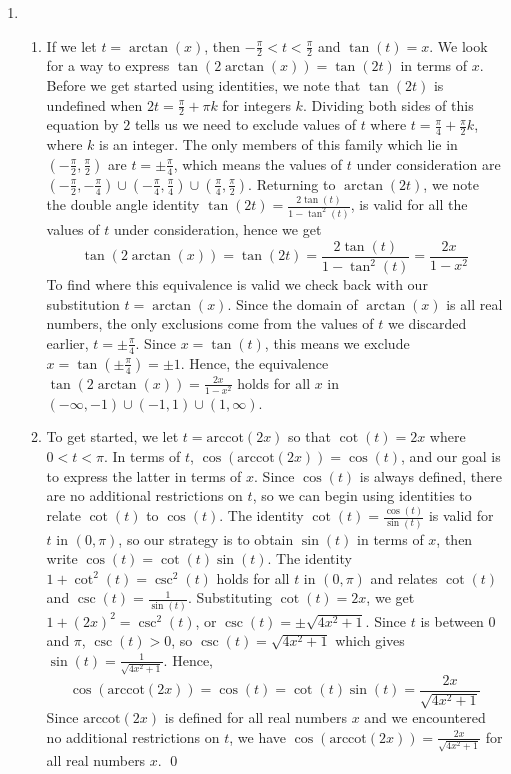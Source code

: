 \documentclass[12pt]{ximera}
\begin{document}
\begin{example}
\begin{enumerate}
\item  

\begin{enumerate}

\item If we let $t = \arctan(x)$, then $-\frac{\pi}{2} < t < \frac{\pi}{2}$ and $\tan(t) = x$.   We look for a way to express $\tan(2 \arctan(x)) = \tan(2t)$ in terms of $x$.  Before we get started using identities, we note that $\tan(2t)$ is undefined when $2t = \frac{\pi}{2} + \pi k$ for integers $k$.  Dividing both sides of this equation by $2$ tells us we need to exclude values of $t$ where $t = \frac{\pi}{4} + \frac{\pi}{2} k$, where $k$ is an integer.  The only members of this family which lie in $\left(-\frac{\pi}{2}, \frac{\pi}{2}\right)$ are $t = \pm \frac{\pi}{4}$, which means the values of $t$ under consideration are $\left(-\frac{\pi}{2}, -\frac{\pi}{4}\right) \cup \left(-\frac{\pi}{4}, \frac{\pi}{4}\right) \cup \left(\frac{\pi}{4}, \frac{\pi}{2}\right)$.  Returning to $\arctan(2t)$, we note the double angle identity $\tan(2t) = \frac{2 \tan(t)}{1 - \tan^{2}(t)}$, is valid for all the values of $t$ under consideration, hence we get \[\tan(2 \arctan(x)) = \tan(2t) = \frac{2 \tan(t)}{1 - \tan^{2}(t)}= \frac{2x}{1-x^2}\]  To find where this equivalence is valid we check back with our substitution $t = \arctan(x)$. Since the domain of $\arctan(x)$ is all real numbers, the only exclusions come from the values of $t$ we discarded earlier, $t = \pm \frac{\pi}{4}$.   Since $x =\tan(t)$, this means we exclude $x = \tan\left(\pm \frac{\pi}{4}\right) = \pm 1$.  Hence, the equivalence  $\tan(2 \arctan(x)) =  \frac{2x}{1-x^2}$ holds for all $x$ in  $(-\infty, -1) \cup (-1,1) \cup (1,\infty)$.

\item  To get started, we let $t = \mbox{arccot}(2x)$ so that  $\cot(t) = 2x$ where $0 < t < \pi$.  In terms of $t$, $\cos(\mbox{arccot}(2x)) = \cos(t)$, and our goal is to express the latter in terms of $x$.   Since $\cos(t)$ is always defined, there are no additional restrictions on $t$, so we can begin using identities to relate $\cot(t)$ to $\cos(t)$.  The identity $\cot(t) = \frac{\cos(t)}{\sin(t)}$ is valid for $t$ in $(0,\pi)$, so our strategy is to obtain $\sin(t)$ in terms of $x$, then write $\cos(t) = \cot(t) \sin(t)$.   The identity $1 + \cot^{2}(t) = \csc^{2}(t)$ holds for all $t$ in $(0,\pi)$ and relates $\cot(t)$ and $\csc(t) = \frac{1}{\sin(t)}$.  Substituting $\cot(t) =2x$, we get  $1 + (2x)^2 = \csc^{2}(t)$, or $\csc(t) =  \pm \sqrt{4x^2+1}$. Since $t$ is between $0$ and $\pi$, $\csc(t) > 0$, so $\csc(t) =\sqrt{4x^2+1}$ which gives $\sin(t) = \frac{1}{\sqrt{4x^2+1}}$. Hence, \[\cos(\mbox{arccot}(2x)) = \cos(t) = \cot(t) \sin(t) = \frac{2x}{\sqrt{4x^2+1}}\]   Since $\mbox{arccot}(2x)$ is defined for all real numbers $x$ and we encountered no additional restrictions on $t$, we have  $\cos\left(\mbox{arccot}(2x)\right) = \frac{2x}{\sqrt{4x^2+1}}$ for all real numbers $x$. \qed

\end{enumerate}

\end{enumerate}

\end{example}
\end{document}
